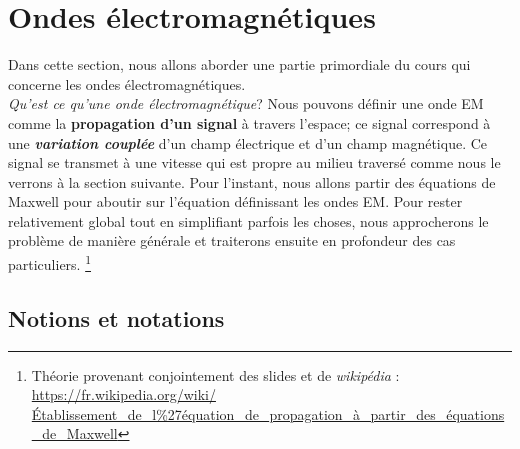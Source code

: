 \chapter{Ondes électromagnétiques}


Dans cette section, nous allons aborder une partie primordiale du cours qui concerne les ondes électromagnétiques. \\
\textit{Qu'est ce qu'une onde électromagnétique}? Nous pouvons définir une onde EM comme la \textbf{propagation d'un signal} à travers l'espace; 
ce signal correspond à une \textbf{\textit{variation couplée}} d'un champ électrique et d'un champ magnétique.  Ce signal se transmet à une vitesse qui est propre au milieu traversé comme nous le verrons à la section suivante. 
Pour l'instant, nous allons partir des équations de Maxwell pour aboutir sur l'équation définissant les ondes EM. Pour rester relativement global tout en simplifiant parfois les choses, nous approcherons le problème de manière générale et traiterons ensuite en profondeur des cas particuliers. 
\footnote{Théorie provenant conjointement des slides et de \textit{wikipédia} : \url{https://fr.wikipedia.org/wiki/Établissement_de_l\%27équation_de_propagation_à_partir_des_équations_de_Maxwell}}


\section{Notions et notations}

